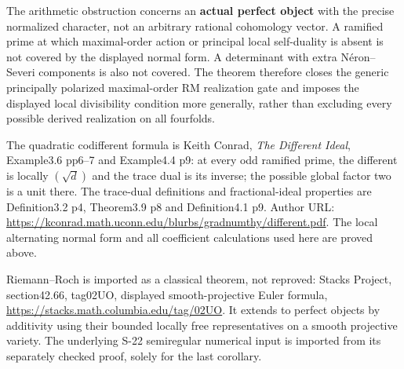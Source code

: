 The arithmetic obstruction concerns an \textbf{actual perfect object} with the precise normalized character, not an arbitrary rational cohomology vector. A ramified prime at which maximal-order action or principal local self-duality is absent is not covered by the displayed normal form. A determinant with extra Néron--Severi components is also not covered. The theorem therefore closes the generic principally polarized maximal-order RM realization gate and imposes the displayed local divisibility condition more generally, rather than excluding every possible derived realization on all fourfolds.

The quadratic codifferent formula is Keith Conrad, \emph{The Different Ideal}, Example3.6 pp6--7 and Example4.4 p9: at every odd ramified prime, the different is locally \((\sqrt d)\) and the trace dual is its inverse; the possible global factor two is a unit there. The trace-dual definitions and fractional-ideal properties are Definition3.2 p4, Theorem3.9 p8 and Definition4.1 p9. Author URL: \url{https://kconrad.math.uconn.edu/blurbs/gradnumthy/different.pdf}. The local alternating normal form and all coefficient calculations used here are proved above.

Riemann--Roch is imported as a classical theorem, not reproved: Stacks Project, section42.66, tag02UO, displayed smooth-projective Euler formula, \url{https://stacks.math.columbia.edu/tag/02UO}. It extends to perfect objects by additivity using their bounded locally free representatives on a smooth projective variety. The underlying S-22 semiregular numerical input is imported from its separately checked proof, solely for the last corollary.
